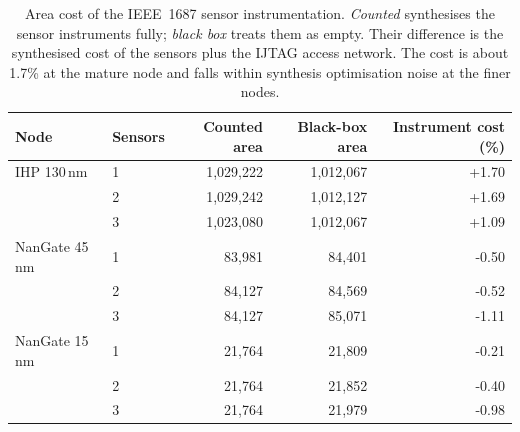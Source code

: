 \begin{table}[htbp]
\centering
\caption{Area cost of the IEEE~1687 sensor instrumentation. \emph{Counted} synthesises the sensor instruments fully; \emph{black box} treats them as empty. Their difference is the synthesised cost of the sensors plus the IJTAG access network. The cost is about 1.7\% at the mature node and falls within synthesis optimisation noise at the finer nodes.}
\label{tab:ijtag}
\small
\begin{tabular}{llrrr}
\toprule
Node & Sensors & Counted area & Black-box area & Instrument cost (\%) \\
\midrule
IHP 130\,nm & 1 & 1,029,222 & 1,012,067 & +1.70 \\
 & 2 & 1,029,242 & 1,012,127 & +1.69 \\
 & 3 & 1,023,080 & 1,012,067 & +1.09 \\
\midrule
NanGate 45\,nm & 1 & 83,981 & 84,401 & -0.50 \\
 & 2 & 84,127 & 84,569 & -0.52 \\
 & 3 & 84,127 & 85,071 & -1.11 \\
\midrule
NanGate 15\,nm & 1 & 21,764 & 21,809 & -0.21 \\
 & 2 & 21,764 & 21,852 & -0.40 \\
 & 3 & 21,764 & 21,979 & -0.98 \\
\bottomrule
\end{tabular}
\end{table}
